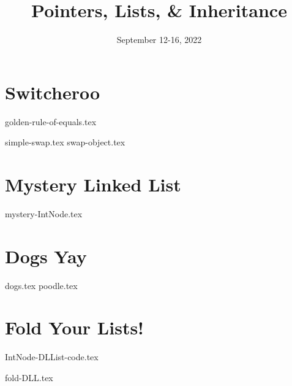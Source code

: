 \documentclass[11pt]{exam}
\title{Pointers, Lists, \& Inheritance}
\date{September 12-16, 2022}
\begin{document}
\maketitle

\section{Switcheroo}
{golden-rule-of-equals.tex}
\begin{questions}
{simple-swap.tex}
{swap-object.tex}
\end{questions}

\clearpage

\section{Mystery Linked List}
\begin{questions}
{mystery-IntNode.tex}
\end{questions}

\clearpage

\section{Dogs Yay}
\begin{questions}
{dogs.tex}
{poodle.tex}
\end{questions}

\clearpage

\section{Fold Your Lists!}

{IntNode-DLList-code.tex}

\begin{questions}



{fold-DLL.tex}
\end{questions}
\end{document}
